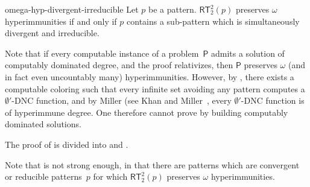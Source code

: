 \documentclass{article}
\newcommand{\Psf}{\mathsf{P}}
\newcommand{\RT}[0]{\mathsf{RT}}
\newtheorem{theorem}{Theorem}
\numberwithin{theorem}{section}
\theoremstyle{definition}
\begin{document}
\begin{repmaintheorem}{omega-hyp-divergent-irreducible}
Let $p$ be a pattern. $\RT^2_2(p)$ preserves $\omega$ hyperimmunities if and only if $p$ contains a sub-pattern which is simultaneously divergent and irreducible.
\end{repmaintheorem}

Note that if every computable instance of a problem~$\Psf$ admits a solution of computably dominated degree, and the proof relativizes, then $\Psf$ preserves $\omega$ (and in fact even uncountably many) hyperimmunities. However, by , there exists a computable coloring such that every infinite set avoiding any pattern computes a $\emptyset'$-DNC function, and by Miller (see Khan and Miller~\cite{khan_forcing_2017}, every $\emptyset'$-DNC function is of hyperimmune degree. One therefore cannot prove  by building computably dominated solutions.


The proof of  is divided into  and .



Note that  is not strong enough, in that there are patterns which are convergent or reducible patterns~$p$ for which $\RT^2_2(p)$ preserves $\omega$ hyperimmunities.
\end{document}
